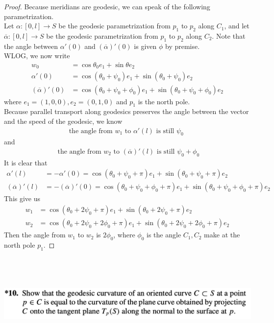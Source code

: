 \documentclass{report}
\begin{document}
\begin{proof}
Because meridians are geodesic, we can speak of the following parametrization.\\

Let $\alpha :[0,l]\rightarrow S$ be the geodesic parametrization from $p_1$ to $p_2$ along $C_1$, and let  $\overline{\alpha }:[0,l]\rightarrow S$ be the geodesic parametrization from $p_1$ to  $p_2$ along  $C_2$. Note that the angle between $\alpha '(0)$ and $(\overline{\alpha })'(0)$ is given $\phi$ by premise.\\ 

WLOG, we now write 
\begin{align*}
w_0&=\cos \theta_0 e_1+ \sin \theta e_2\\
\alpha '(0)&=\cos (\theta_0 + \psi_0)e_1+ \sin (\theta_0+\psi_0)e_2\\
(\overline{\alpha })'(0)&=\cos (\theta_0 + \psi_0 + \phi_0)e_1+ \sin (\theta_0+ \psi_0+\phi_0)e_2
\end{align*}
where $e_1=(1,0,0),e_2=(0,1,0)$ and $p_1$ is the north pole.\\

Because parallel transport along geodesics preserves the angle between the vector and the speed of the geodesic, we know 
\begin{align*}
\text{ the angle from }w_1\text{ to }\alpha '(l)\text{ is still $\psi_0$ }
\end{align*}
and 
\begin{align*}
\text{ the angle from }w_2\text{ to }(\overline{\alpha })'(l)\text{ is still }\psi_0+\phi_0
\end{align*}
It is clear that
\begin{align*}
\alpha '(l)&=-\alpha '(0)=\cos (\theta_0+ \psi_0 +\pi)e_1+ \sin (\theta_0+\psi_0+\pi)e_2\\
(\overline{\alpha })'(l)&=-(\overline{\alpha })'(0)=\cos (\theta_0+\psi_0 +\phi_0+ \pi)e_1 + \sin (\theta_0 + \psi_0 + \phi_0 + \pi)e_2
\end{align*}
This give us 
\begin{align*}
w_1&= \cos (\theta_0 + 2\psi_0 + \pi)e_1+ \sin (\theta_0+2\psi_0+\pi)e_2\\
w_2&=\cos (\theta_0 + 2\psi_0 + 2\phi_0 + \pi)e_1+\sin (\theta_0+2\psi_0+2\phi_0 + \pi)e_2
\end{align*}
Then the angle from $w_1$ to  $w_2$ is $2\phi_0$, where $\phi_0$ is the angle $C_1,C_2$ make at the north pole $p_1$.
\end{proof}
\begin{question}{}{}
\includegraphics[height=5cm,width=18cm]{hw74}
\end{question}
\end{document}
